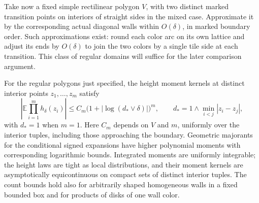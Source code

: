 Take now a fixed simple rectilinear polygon $V$, with two distinct
marked transition points on interiors of straight sides in the mixed
case.  Approximate it by the corresponding actual diagonal walls
within $O(\delta)$, in marked boundary order.  Such approximations
exist: round each color arc on its own lattice and adjust its ends
by $O(\delta)$ to join the two colors by a single tile side at each
transition.  This class of regular domains will suffice for the
later comparison argument.

\begin{lemma}\label{q4field:moment-kernels}
For the regular polygons just specified, the height moment kernels at
distinct interior points $z_1,\ldots,z_m$ satisfy
\begin{equation}\label{q4field:log-kernel}
 \left|\mathbb E\prod_{i=1}^m h_\delta(z_i)\right|
 \le C_m\bigl(1+|\log(d_*\vee\delta)|\bigr)^m,
 \qquad d_*=1\wedge\min_{i<j}|z_i-z_j|,
\end{equation}
with $d_*=1$ when $m=1$.  Here $C_m$ depends on $V$ and $m$,
uniformly over the interior tuples, including those approaching
the boundary.  Geometric majorants for the conditional
signed expansions have higher polynomial moments with corresponding
logarithmic bounds.  Integrated moments are uniformly integrable;
the height laws are tight as local distributions, and their moment
kernels are asymptotically equicontinuous on compact sets of distinct
interior tuples.  The count bounds hold also for arbitrarily shaped
homogeneous walls in a fixed bounded box and for products of disks
of one wall color.
\end{lemma}

